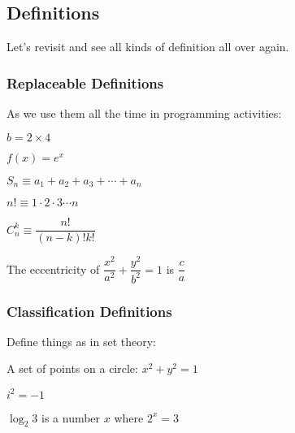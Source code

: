 \subsection{Definitions}

Let's revisit and see all kinds of definition all over again.

\subsubsection*{Replaceable Definitions}

As we use them all the time in programming activities:

\begin{example}
 $b = 2\times 4$
\end{example}


\begin{example}
  $f(x) = e^x$
\end{example}

\begin{example}
  $S_n \equiv a_1 + a_2 + a_3 + \cdots + a_n$
\end{example}

\begin{example}
  $n! \equiv 1\cdot 2\cdot 3 \cdots n$
\end{example}

\begin{example}
  $C_n^k \equiv \dfrac{n!}{(n-k)!k!}$
\end{example}

\begin{example}
  The eccentricity of $\dfrac{x^2}{a^2} + \dfrac{y^2}{b^2} =1$ is $\dfrac{c}{a}$
\end{example}

\subsubsection*{Classification Definitions}

Define things as in set theory:

\begin{example}
  A set of points on a circle: $x^2 + y^2 =1$
\end{example}

\begin{example}
  $i^2 = -1$
\end{example}


\begin{example}
  $\log_2{3}$ is a number $x$ where $2^x=3$
\end{example}


